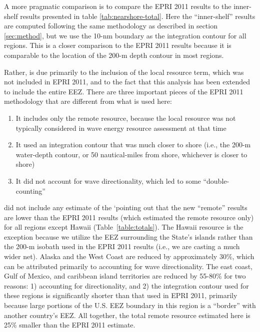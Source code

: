 A more pragmatic comparison is to compare the EPRI 2011 results to the inner-shelf results presented in table \ref{tab:nearshore-total}. Here the ``inner-shelf'' results are computed following the same methodology as described in section \ref{sec:method}, but we use the 10-nm boundary as the integration contour for all regions. This is a closer comparison to the EPRI 2011 results because it is comparable to the location of the 200-m depth contour in most regions.  

Rather,  is due primarily to the inclusion of the local resource term, which was not included in EPRI 2011, and to the fact that this analysis has been extended to include the entire EEZ. 
There are three important pieces of the EPRI 2011 methodology that are different from what is used here:
\begin{enumerate}
\item It includes only the remote resource, because the local resource was not typically considered in wave energy resource assessment at that time
\item It used an integration contour that was much closer to shore (i.e., the 200-m water-depth contour, or 50 nautical-miles from shore, whichever is closer to shore)
\item It did not account for wave directionality, which led to some ``double-counting'' \cite{nationalresearchcouncilEvaluationDepartmentEnergy2013}
\end{enumerate}

did not include any estimate of the `pointing out that the new ``remote'' results are lower than the EPRI 2011 results (which estimated the remote resource only) for all regions except Hawaii (Table~\ref{table:totals}). The Hawaii resource is the exception because we utilize the EEZ surrounding the State's islands rather than the 200-m isobath used in the EPRI 2011 results (i.e., we are casting a much wider net). Alaska and the West Coast are reduced by approximately 30\%, which can be attributed primarily to accounting for wave directionality. The east coast, Gulf of Mexico, and caribbean island territories are reduced by 55-80\% for two reasons: 1) accounting for directionality, and 2) the integration contour used for these regions is significantly shorter than that used in EPRI 2011, primarily because large portions of the U.S. EEZ boundary in this region is a ``border'' with another country's EEZ. All together, the total remote resource estimated here is 25\% smaller than the EPRI 2011 estimate.

